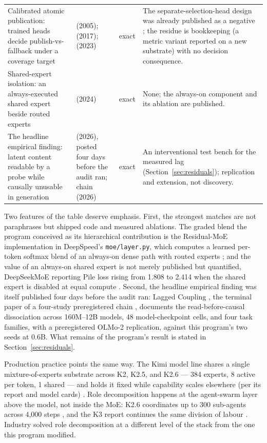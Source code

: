 \documentclass[10pt,a4paper]{article}
\begin{document}
\begin{table}[htbp]
\begin{tabularx}{\textwidth}{@{}>{\raggedright\arraybackslash}p{}>{\raggedright\arraybackslash}p{}c>{\raggedright\arraybackslash}X@{}}
\addlinespace
Calibrated atomic publication: trained heads decide publish-vs-fallback under a coverage target & \cite{vovk2005} (2005); \cite{geifman2017} (2017); \cite{feng2023} (2023) & exact & The separate-selection-head design was already published as a negative \cite{feng2023}; the residue is bookkeeping (a metric variant reported on a new substrate) with no decision consequence. \\
\addlinespace
Shared-expert isolation: an always-executed shared expert beside routed experts & \cite{dai2024} (2024) & exact & None; the always-on component and its ablation are published. \\
\addlinespace
The headline empirical finding: latent content readable by a probe while causally unusable in generation & \cite{xun2026lagged} (2026), posted four days before the audit ran; chain \cite{xun2026evidence,xun2026routing,xun2026located} (2026) & exact & An interventional test bench for the measured lag (Section~\ref{sec:residuals}); replication and extension, not discovery. \\
\bottomrule
\end{tabularx}
\end{table}

Two features of the table deserve emphasis. First, the strongest matches are not paraphrases but shipped code and measured ablations. The graded blend the program conceived as its hierarchical contribution is the Residual-MoE implementation in DeepSpeed's \texttt{moe/layer.py}, which computes a learned per-token softmax blend of an always-on dense path with routed experts \cite{rajbhandari2022}; and the value of an always-on shared expert is not merely published but quantified, DeepSeekMoE reporting Pile loss rising from 1.808 to 2.414 when the shared expert is disabled at equal compute \cite{dai2024}. Second, the headline empirical finding was itself published four days before the audit ran: Lagged Coupling \cite{xun2026lagged}, the terminal paper of a four-study preregistered chain \cite{xun2026evidence,xun2026routing,xun2026located}, documents the read-before-causal dissociation across 160M--12B models, 48 model-checkpoint cells, and four task families, with a preregistered OLMo-2 replication, against this program's two seeds at 0.6B. What remains of the program's result is stated in Section~\ref{sec:residuals}.

Production practice points the same way. The Kimi model line shares a single mixture-of-experts substrate across K2, K2.5, and K2.6 --- 384 experts, 8 active per token, 1 shared --- and holds it fixed while capability scales elsewhere (per its report and model cards) \cite{kimik2report,kimik25github,kimik26card}. Role decomposition happens at the agent-swarm layer above the model, not inside the MoE: K2.6 coordinates up to 300 sub-agents across 4{,}000 steps \cite{marktechpost2026k26}, and the K3 report continues the same division of labour \cite{pandaily2026k3}. Industry solved role decomposition at a different level of the stack from the one this program modified.
\end{document}
